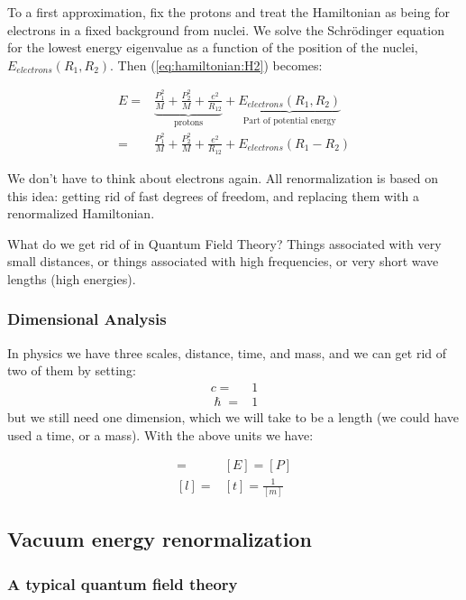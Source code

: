 \documentclass[]{article}
\begin{document}
To a first approximation, fix the protons and treat the Hamiltonian as being for electrons in a fixed background from nuclei. We solve the Schr\"odinger equation for the lowest energy eigenvalue as a function of the position of the nuclei, $E_{electrons}(R_1,R_2)$. Then (\ref{eq:hamiltonian:H2}) becomes:

\begin{align*}
	E=& \underbrace{\frac{P_1^2}{M} + \frac{P_2^2}{M} + \frac{e^2}{R_{12}}}_\text{protons} +\underbrace{ E_{electrons}(R_1,R_2)}_\text{Part of potential energy}\\
	=& \frac{P_1^2}{M} + \frac{P_2^2}{M} + \frac{e^2}{R_{12}}+ E_{electrons}(R_1-R_2)
\end{align*}

We don't have to think about electrons again. All renormalization is based on this idea: getting rid of fast degrees of freedom, and replacing them with a renormalized Hamiltonian. 

What do we get rid of in Quantum Field Theory? Things associated with very small distances, or things associated with high frequencies, or very short wave lengths (high energies).

\subsubsection{Dimensional Analysis}

In physics we have three scales, distance, time, and mass, and we can get rid of two of them by setting:
\begin{align*}
	c=&1\\
	\hslash=& 1
\end{align*} 
but we still need one dimension, which we will take to be a length (we could have used a time, or a mass). With the above units we have: 

\begin{align*}
	[m] =& [E]	= [P]\\
	[l] =& [t]	= \frac{1}{[m]}
\end{align*}

\subsection{Vacuum energy renormalization}

\subsubsection{A typical quantum field theory}
\end{document}
